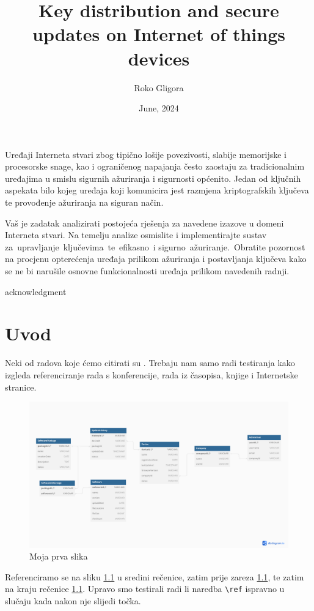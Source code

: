 \documentclass[zavrsnirad]{fer}
\title{Key distribution and secure updates on Internet of things devices}
\author{Roko Gligora}
\date{June, 2024}
\begin{document}
	\maketitle
	
	Uređaji Interneta stvari zbog tipično lošije povezivosti, slabije memorijske i procesorske snage, kao i ograničenog napajanja često zaostaju za tradicionalnim uređajima u smislu sigurnih ažuriranja i sigurnosti općenito. Jedan od ključnih aspekata bilo kojeg uređaja koji komunicira jest razmjena kriptografskih ključeva te provođenje ažuriranja na siguran način.
	
	Vaš je zadatak analizirati postojeća rješenja za navedene izazove u domeni Interneta stvari. Na temelju analize osmislite i implementirajte sustav za upravljanje ključevima te efikasno i sigurno ažuriranje. Obratite pozornost na procjenu opterećenja uređaja prilikom ažuriranja i postavljanja ključeva kako se ne bi narušile osnovne funkcionalnosti uređaja prilikom navedenih radnji.
	
	\begin{zahvale}
		acknowledgment
	\end{zahvale}
	
	\mainmatter
	
	\tableofcontents
	
	\chapter{Uvod}
	\label{pog:uvod}
	
	Neki od radova koje ćemo citirati su \cite{maurer1993secret}.
	Trebaju nam samo radi testiranja kako izgleda referenciranje rada s konferencije, rada iz časopisa, knjige i Internetske stranice.
	
	\begin{figure}[htb]
		\centering
		\includegraphics[width=0.38\linewidth]{Figures/ER_diagram_KDSUF_v2.pdf} 
		\caption{Moja prva slika}
		\label{slk:prvaslika}
	\end{figure}
	
	Referenciramo se na sliku \ref{slk:prvaslika} u sredini rečenice, zatim prije zareza \ref{slk:prvaslika}, te zatim na kraju rečenice \ref{slk:prvaslika}.
	Upravo smo testirali radi li naredba \verb|\ref| ispravno u slučaju kada nakon nje slijedi točka.
	
\end{document}
